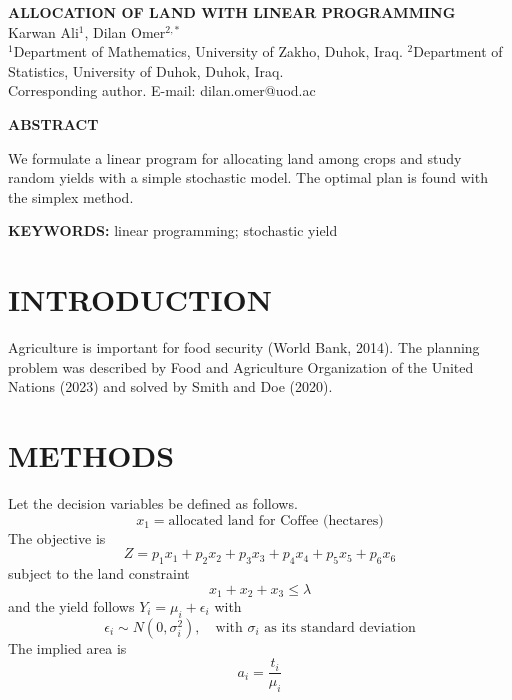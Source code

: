 \documentclass[a4paper,10pt]{article}
\begin{document}
\begin{center}
{\large\bfseries ALLOCATION OF LAND WITH LINEAR PROGRAMMING}\\[6pt]
Karwan Ali$^{1}$, Dilan Omer$^{2,*}$\\[4pt]
{\small $^{1}$Department of Mathematics, University of Zakho, Duhok, Iraq. $^{2}$Department of Statistics, University of Duhok, Duhok, Iraq.}\\[4pt]
{\small * Corresponding author. E-mail: dilan.omer@uod.ac}
\end{center}

\noindent\textbf{ABSTRACT}

\noindent We formulate a linear program for allocating land among crops and study random yields with a
simple stochastic model. The optimal plan is found with the simplex method.

\noindent\textbf{KEYWORDS:} linear programming; stochastic yield

\section{INTRODUCTION}
Agriculture is important for food security (World Bank, 2014). The planning problem was described by
Food and Agriculture Organization of the United Nations (2023) and solved by Smith and Doe (2020).

\section{METHODS}
Let the decision variables be defined as follows.
\begin{equation}
x_1 = \text{allocated land for Coffee (hectares)}
\end{equation}
The objective is
\begin{equation}
Z = p_1x_1 + p_2x_2 + p_3x_3 + p_4x_4 + p_5x_5 + p_6x_6
\end{equation}
subject to the land constraint
\begin{equation}
x_1 + x_2 + x_3 \leq \lambda
\end{equation}
and the yield follows $Y_i = \mu_i + \epsilon_i$ with
\begin{equation}
\epsilon_i \sim N(0,\sigma_i^2), \quad \text{with } \sigma_i \text{ as its standard deviation}
\end{equation}
The implied area is
\begin{equation}
a_i = \frac{t_i}{\mu_i}
\end{equation}
\end{document}
